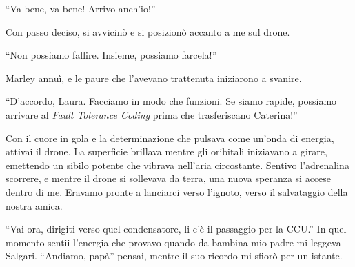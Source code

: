 \begin{dialogue}
 \enquote{Va bene, va bene! Arrivo anch'io!}
\end{dialogue}

Con passo deciso, si avvicinò e si posizionò accanto a me sul drone.

\begin{dialogue}
 \enquote{Non possiamo fallire. Insieme, possiamo farcela!}
\end{dialogue}

Marley annuì, e le paure che l'avevano trattenuta iniziarono a svanire.

\begin{dialogue}
 \enquote{D'accordo, Laura. Facciamo in modo che funzioni. Se siamo rapide, possiamo arrivare al \textit{Fault Tolerance Coding} prima che trasferiscano Caterina!}
\end{dialogue}

Con il cuore in gola e la determinazione che pulsava come un'onda di energia, attivai il drone. La superficie  brillava mentre gli oribitali iniziavano a girare, emettendo un sibilo potente che vibrava nell'aria circostante. Sentivo l'adrenalina scorrere, e mentre il drone si sollevava da terra, una nuova speranza si accese dentro di me. Eravamo pronte a lanciarci verso l'ignoto, verso il salvataggio della nostra amica.

\begin{dialogue}
 \enquote{Vai ora, dirigiti verso quel condensatore, li c'è il passaggio per la CCU.} In quel momento sentii l'energia che provavo quando da bambina mio padre mi leggeva Salgari. ``Andiamo, papà'' pensai, mentre il suo ricordo mi sfiorò per un istante.
\end{dialogue}
